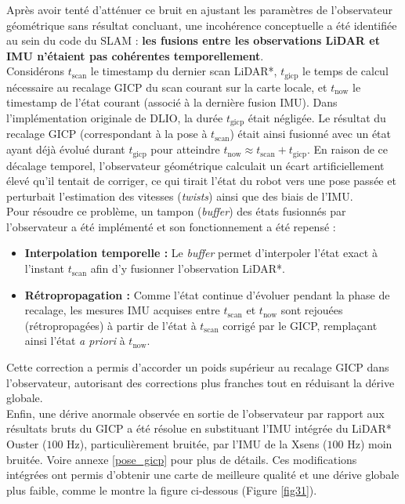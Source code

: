 Après avoir tenté d'atténuer ce bruit en ajustant les paramètres de l'observateur géométrique sans résultat concluant, une incohérence conceptuelle a été identifiée au sein du code du SLAM : \textbf{les fusions entre les observations LiDAR et IMU n'étaient pas cohérentes temporellement}.\\

Considérons $t_{\text{scan}}$ le timestamp du dernier scan LiDAR*, $t_{\text{gicp}}$ le temps de calcul nécessaire au recalage GICP du scan courant sur la carte locale, et $t_{\text{now}}$ le timestamp de l'état courant (associé à la dernière fusion IMU). Dans l'implémentation originale de DLIO, la durée $t_{\text{gicp}}$ était négligée. Le résultat du recalage GICP (correspondant à la pose à $t_{\text{scan}}$) était ainsi fusionné avec un état ayant déjà évolué durant $t_{\text{gicp}}$ pour atteindre $t_{\text{now}} \approx t_{\text{scan}} + t_{\text{gicp}}$. En raison de ce décalage temporel, l'observateur géométrique calculait un écart artificiellement élevé qu'il tentait de corriger, ce qui tirait l'état du robot vers une pose passée et perturbait l'estimation des vitesses (\textit{twists}) ainsi que des biais de l'IMU.\\

Pour résoudre ce problème, un tampon (\textit{buffer}) des états fusionnés par l'observateur a été implémenté et son fonctionnement a été repensé :\\

\begin{itemize}
    \item \textbf{Interpolation temporelle :} Le \textit{buffer} permet d'interpoler l'état exact à l'instant $t_{\text{scan}}$ afin d'y fusionner l'observation LiDAR*.
    \item \textbf{Rétropropagation :} Comme l'état continue d'évoluer pendant la phase de recalage, les mesures IMU acquises entre $t_{\text{scan}}$ et $t_{\text{now}}$ sont rejouées (rétropropagées) à partir de l'état à $t_{\text{scan}}$ corrigé par le GICP, remplaçant ainsi l'état \textit{a priori} à $t_{\text{now}}$.\\
\end{itemize}

Cette correction a permis d'accorder un poids supérieur au recalage GICP dans l'observateur, autorisant des corrections plus franches tout en réduisant la dérive globale.\\

Enfin, une dérive anormale observée en sortie de l'observateur par rapport aux résultats bruts du GICP a été résolue en substituant l'IMU intégrée du LiDAR* Ouster ($100\text{ Hz}$), particulièrement bruitée, par l'IMU de la Xsens ($100\text{ Hz}$) moin bruitée. Voire annexe \hyperref[annexe7]{[pose\_gicp]} pour plus de détails. Ces modifications intégrées ont permis d'obtenir une carte de meilleure qualité et une dérive globale plus faible, comme le montre la figure ci-dessous (Figure \ref{fig31}).
 
